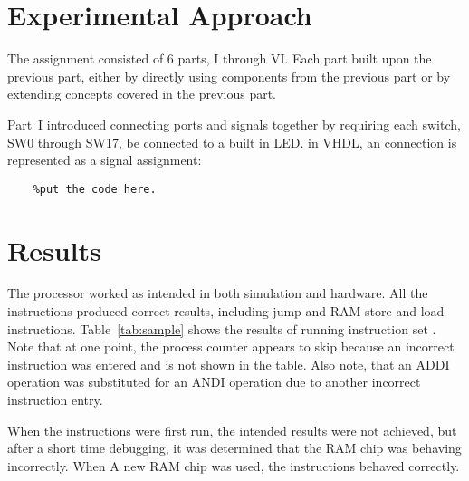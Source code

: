\documentclass{scrreprt}
\newcommand{\Table}[1]{Table~\ref{tab:#1}}
\begin{document}
\section{Experimental Approach}
    The assignment consisted of 6 parts, I through VI. Each part built upon the previous part, either by directly using components from the previous part or by extending concepts covered in the previous part.
    
    Part~I introduced connecting ports and signals together by requiring each switch, SW0 through SW17, be connected to a built in LED. in VHDL, an connection is represented as a signal assignment: 
    
    \begin{lstlisting}
    %put the code here.
    \end{lstlisting}
    
    

\section{Results}
    The processor worked as intended in both simulation and hardware. All the instructions produced correct results, including jump and RAM store and load instructions. \Table{sample} shows the results of running instruction set . Note that at one point, the process counter appears to skip because an incorrect instruction was entered and is not shown in the table. Also note, that an ADDI operation was substituted for an ANDI operation due to another incorrect instruction entry.
    
    When the instructions were first run, the intended results were not achieved, but after a short time debugging, it was determined that the RAM chip was behaving incorrectly. When A new RAM chip was used, the instructions behaved correctly.
    
\end{document}

